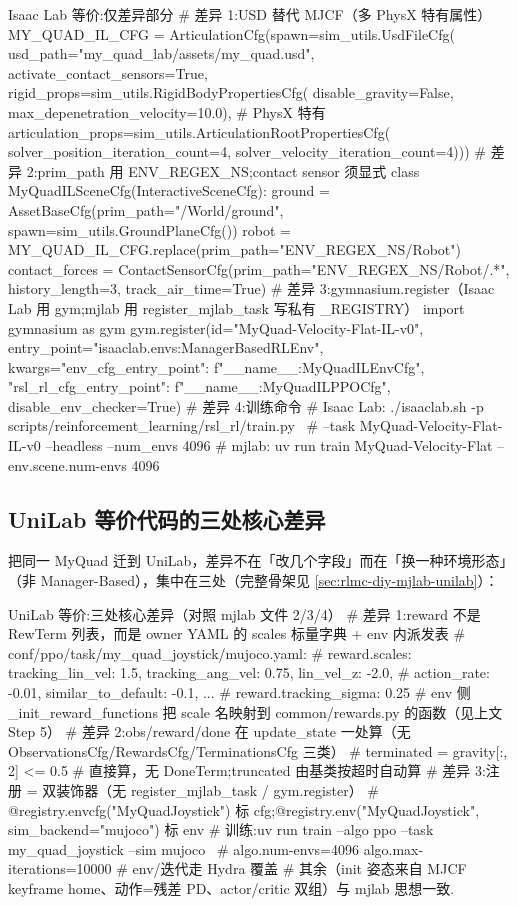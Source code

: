 \begin{codebox}[Python]{Isaac Lab 等价:仅差异部分}
# 差异 1:USD 替代 MJCF（多 PhysX 特有属性）
MY_QUAD_IL_CFG = ArticulationCfg(spawn=sim_utils.UsdFileCfg(
    usd_path="my_quad_lab/assets/my_quad.usd", activate_contact_sensors=True,
    rigid_props=sim_utils.RigidBodyPropertiesCfg(
        disable_gravity=False, max_depenetration_velocity=10.0),     # PhysX 特有
    articulation_props=sim_utils.ArticulationRootPropertiesCfg(
        solver_position_iteration_count=4, solver_velocity_iteration_count=4)))
# 差异 2:prim_path 用 {ENV_REGEX_NS};contact sensor 须显式
class MyQuadILSceneCfg(InteractiveSceneCfg):
    ground = AssetBaseCfg(prim_path="/World/ground", spawn=sim_utils.GroundPlaneCfg())
    robot  = MY_QUAD_IL_CFG.replace(prim_path="{ENV_REGEX_NS}/Robot")
    contact_forces = ContactSensorCfg(prim_path="{ENV_REGEX_NS}/Robot/.*",
        history_length=3, track_air_time=True)
# 差异 3:gymnasium.register（Isaac Lab 用 gym;mjlab 用 register_mjlab_task 写私有 _REGISTRY）
import gymnasium as gym
gym.register(id="MyQuad-Velocity-Flat-IL-v0",
    entry_point="isaaclab.envs:ManagerBasedRLEnv",
    kwargs={"env_cfg_entry_point": f"{__name__}:MyQuadILEnvCfg",
            "rsl_rl_cfg_entry_point": f"{__name__}:MyQuadILPPOCfg"},
    disable_env_checker=True)
# 差异 4:训练命令
#   Isaac Lab: ./isaaclab.sh -p scripts/reinforcement_learning/rsl_rl/train.py \
#              --task MyQuad-Velocity-Flat-IL-v0 --headless --num_envs 4096
#   mjlab:     uv run train MyQuad-Velocity-Flat --env.scene.num-envs 4096
\end{codebox}

\subsection{UniLab 等价代码的三处核心差异}
\label{sec:rlmc-diy-fullcode-unilab}

把同一 MyQuad 迁到 UniLab，差异不在「改几个字段」而在「换一种环境形态」（非 Manager-Based），集中在三处（完整骨架见 \cref{sec:rlmc-diy-mjlab-unilab}）：

\begin{codebox}[Python]{UniLab 等价:三处核心差异（对照 mjlab 文件 2/3/4）}
# 差异 1:reward 不是 RewTerm 列表，而是 owner YAML 的 scales 标量字典 + env 内派发表
#   conf/ppo/task/my_quad_joystick/mujoco.yaml:
#     reward.scales: {tracking_lin_vel: 1.5, tracking_ang_vel: 0.75, lin_vel_z: -2.0,
#                     action_rate: -0.01, similar_to_default: -0.1, ...}
#     reward.tracking_sigma: 0.25
#   env 侧 _init_reward_functions 把 scale 名映射到 common/rewards.py 的函数（见上文 Step 5）
# 差异 2:obs/reward/done 在 update_state 一处算（无 ObservationsCfg/RewardsCfg/TerminationsCfg 三类）
#   terminated = gravity[:, 2] <= 0.5            # 直接算，无 DoneTerm;truncated 由基类按超时自动算
# 差异 3:注册 = 双装饰器（无 register_mjlab_task / gym.register）
#   @registry.envcfg("MyQuadJoystick") 标 cfg;@registry.env("MyQuadJoystick", sim_backend="mujoco") 标 env
#   训练:uv run train --algo ppo --task my_quad_joystick --sim mujoco \
#         algo.num-envs=4096 algo.max-iterations=10000     # env/迭代走 Hydra 覆盖
# 其余（init 姿态来自 MJCF keyframe home、动作=残差 PD、actor/critic 双组）与 mjlab 思想一致.
\end{codebox}

